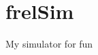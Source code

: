 \chapter{frel\+Sim}
\hypertarget{md_README}{}\label{md_README}
\label{md_README_autotoc_md0}%
%
My simulator for fun 